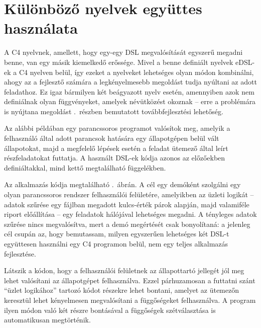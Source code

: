 \section{Különböző nyelvek együttes használata}\label{sec:uses:mix}

A C4 nyelvnek, amellett, hogy egy-egy \gls{DSL} megvalósítását egyszerű megadni benne, van egy másik kiemelkedő erőssége.
Mivel a benne definiált nyelvek \gls{eDSL}-ek a C4 nyelven belül, így ezeket a nyelveket lehetséges olyan módon kombinálni, ahogy az a fejlesztő számára a legkényelmesebb megoldást tudja nyúltani az adott feladathoz.
Ez igaz bármilyen két beágyazott nyelv esetén, amennyiben azok nem definiálnak olyan függvényeket, amelyek névütközést okoznak -- erre a problémára is nyújtana megoldást .~részben bemutatott továbbfejlesztési lehetőség.

Az alábbi példában egy parancssoros programot valósítok meg, amelyik a felhasználó által adott parancsok hatására egy állapotgépen belül vált állapotokat, majd a megfelelő lépések esetén a feladat ütemező által leírt részfeladatokat futtatja.
A használt \gls{DSL}-ek kódja azonos az előzőekben definiáltakkal, mind kettő megtalálható függelékben.

Az alkalmazás kódja megtalálható .~ábrán.
A cél egy demóként szolgálni egy olyan parancssoros rendszer felhasználói felületére, amelyikben az üzleti logikát -- adatok szűrése egy fájlban megadott kulcs-érték párok alapján, majd valamiféle riport előállítása -- egy feladatok hálójával lehetséges megadni.
A tényleges adatok szűrése nincs megvalósítva, mert a demó megértését csak bonyolítaná: a jelenleg cél csupán az, hogy bemutassam, milyen egyszerűen lehetséges két \gls{DSL}-t együttesen használni egy C4 programon belül, nem egy teljes alkalmazás fejlesztése.

Látszik a kódon, hogy a felhasználói felületnek az állapottartó jellegét jól meg lehet valósítani az állapotgépet felhasználva.
Ezzel párhuzamosan a futtatni szánt ``üzlet logikához'' tartozó kódot részekre lehet bontani, amelyet az ütemezőn keresztül lehet kényelmesen megvalósítani a függőségeket felhasználva.
A program ilyen módon való két részre bontásával a függőségek szétválasztása is automatikusan megtörténik.

